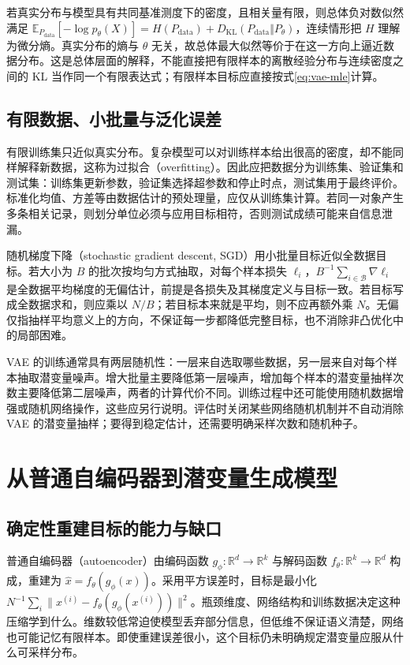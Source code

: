 \documentclass[UTF8,12pt,a4paper,fontset=fandol]{ctexart}
\begin{document}
若真实分布与模型具有共同基准测度下的密度，且相关量有限，则总体负对数似然满足 $\mathbb E_{P_{\mathrm{data}}}[-\log p_\theta(X)]=H(P_{\mathrm{data}})+D_{\mathrm{KL}}(P_{\mathrm{data}}\Vert P_\theta)$，连续情形把 $H$ 理解为微分熵。真实分布的熵与 $\theta$ 无关，故总体最大似然等价于在这一方向上逼近数据分布。这是总体层面的解释，不能直接把有限样本的离散经验分布与连续密度之间的 KL 当作同一个有限表达式；有限样本目标应直接按式\eqref{eq:vae-mle}计算。

\subsection{有限数据、小批量与泛化误差}
有限训练集只近似真实分布。复杂模型可以对训练样本给出很高的密度，却不能同样解释新数据，这称为过拟合（overfitting）。因此应把数据分为训练集、验证集和测试集：训练集更新参数，验证集选择超参数和停止时点，测试集用于最终评价。标准化均值、方差等由数据估计的预处理量，应仅从训练集计算。若同一对象产生多条相关记录，则划分单位必须与应用目标相符，否则测试成绩可能来自信息泄漏。

随机梯度下降（stochastic gradient descent, SGD）用小批量目标近似全数据目标。若大小为 $B$ 的批次按均匀方式抽取，对每个样本损失 $\ell_i$，$B^{-1}\sum_{i\in\mathcal B}\nabla\ell_i$ 是全数据平均梯度的无偏估计，前提是各损失及其梯度定义与目标一致。若目标写成全数据求和，则应乘以 $N/B$；若目标本来就是平均，则不应再额外乘 $N$。无偏仅指抽样平均意义上的方向，不保证每一步都降低完整目标，也不消除非凸优化中的局部困难。

VAE 的训练通常具有两层随机性：一层来自选取哪些数据，另一层来自对每个样本抽取潜变量噪声。增大批量主要降低第一层噪声，增加每个样本的潜变量抽样次数主要降低第二层噪声，两者的计算代价不同。训练过程中还可能使用随机数据增强或随机网络操作，这些应另行说明。评估时关闭某些网络随机机制并不自动消除 VAE 的潜变量抽样；要得到稳定估计，还需要明确采样次数和随机种子。

\section{从普通自编码器到潜变量生成模型}
\label{sec:vae-generative}

\subsection{确定性重建目标的能力与缺口}
普通自编码器（autoencoder）由编码函数 $g_\phi:\mathbb R^d\to\mathbb R^k$ 与解码函数 $f_\theta:\mathbb R^k\to\mathbb R^d$ 构成，重建为 $\widehat x=f_\theta(g_\phi(x))$。采用平方误差时，目标是最小化 $N^{-1}\sum_i\|x^{(i)}-f_\theta(g_\phi(x^{(i)}))\|^2$。瓶颈维度、网络结构和训练数据决定这种压缩学到什么。维数较低常迫使模型丢弃部分信息，但低维不保证语义清楚，网络也可能记忆有限样本。即使重建误差很小，这个目标仍未明确规定潜变量应服从什么可采样分布。
\end{document}
